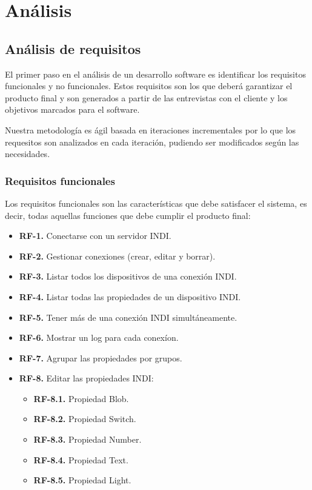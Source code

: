 \chapter{Análisis}

\section{Análisis de requisitos}

El primer paso en el análisis de un desarrollo software es identificar los requisitos funcionales y no funcionales. Estos requisitos son los que deberá garantizar el producto final y son generados a partir de las entrevistas con el cliente y los objetivos marcados para el software.

\bigskip
Nuestra metodología es ágil basada en iteraciones incrementales por lo que los requesitos son analizados en cada iteración, pudiendo ser modificados según las necesidades.


\subsection{Requisitos funcionales}

Los requisitos funcionales son las características que debe satisfacer el sistema, es decir, todas aquellas funciones que debe cumplir el producto final:

\begin{itemize}
	\item \textbf{RF-1.} Conectarse con un servidor INDI.
	\item \textbf{RF-2.} Gestionar conexiones (crear, editar y borrar).
	\item \textbf{RF-3.} Listar todos los dispositivos de una conexión INDI.
	\item \textbf{RF-4.} Listar todas las propiedades de un dispositivo INDI.
	\item \textbf{RF-5.} Tener más de una conexión INDI simultáneamente.
	\item \textbf{RF-6.} Mostrar un log para cada conexíon.
	\item \textbf{RF-7.} Agrupar las propiedades por grupos.
	\item \textbf{RF-8.} Editar las propiedades INDI:
		\begin{itemize}
			\item \textbf{RF-8.1.} Propiedad Blob.
			\item \textbf{RF-8.2.} Propiedad Switch.
			\item \textbf{RF-8.3.} Propiedad Number.
			\item \textbf{RF-8.4.} Propiedad Text.
			\item \textbf{RF-8.5.} Propiedad Light.
		\end{itemize}
\end{itemize}

